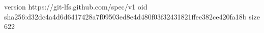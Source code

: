 version https://git-lfs.github.com/spec/v1
oid sha256:d32dc4a4d6d6417428a7f09503ed8e4d480f03f32431821ffee382ce420fa18b
size 622
